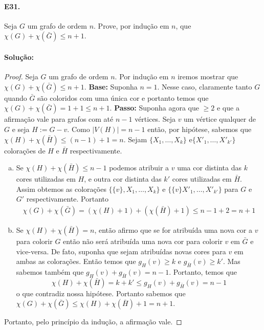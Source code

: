 \documentclass[11pt,a4paper,notitlepage]{exam}
\begin{document}
\paragraph*{E31.} Seja $G$ um grafo de ordem $n$. Prove, por
indução em $n$, que $\chi(G) + \chi(\bar{G}) \leq n + 1$.

\paragraph*{Solução:}
\begin{proof}
    Seja $G$ um grafo de ordem $n$. Por indução em $n$ iremos mostrar
    que $\chi(G) + \chi(\bar{G}) \leq n + 1$.\newline
    \textbf{Base:} Suponha $n = 1$. Nesse caso, claramente tanto $G$
    quando $\bar{G}$ são coloridos com uma única cor e portanto temos
    que $\chi(G) + \chi(\bar{G}) =  1 + 1 \leq n + 1$. \newline
    \textbf{Passo:} Suponha agora que $\geq 2$ e que a afirmação
    vale para grafos com até $n-1$ vértices.
    Seja $v$ um vértice qualquer de $G$ e seja $H := G - v$. Como
    $|V(H)| = n-1$ então, por hipótese, sabemos que $\chi(H) +
    \chi(\bar{H}) \leq (n-1) + 1 = n$. Sejam $\{X_1, \dots,X_k\}$
    e$\{X'_1, \dots, X'_{k'} \}$ colorações de $H$ e $\bar{H}$
    respectivamente. 
    \begin{enumerate}[a)]
        \item  Se $\chi(H) + \chi(\bar{H}) \leq n-1$ podemos atribuir
            a $v$ uma cor distinta das $k$ cores utilizadas em $H$, e
            outra cor distinta das $k'$ cores utilizadas em
            $\bar{H}$. Assim obtemos as colorações $\{\{v\}, X_1, \dots,X_k\}$ e
            $\{\{v\}X'_1, \dots, X'_{k'} \}$ para $G$ e $G'$
            respectivamente. Portanto
            \begin{align*}
                \chi(G) + \chi(\bar{G}) = (\chi(H) + 1) +
                (\chi(\bar{H}) + 1) \leq n-1 + 2 = n+1
            \end{align*}

        \item Se $\chi(H) + \chi(\bar{H}) = n$, então afirmo que se
            for atribuída uma nova cor a $v$ para colorir $G$ então
            não será atribuída uma nova cor para colorir $v$ em
            $\bar{G}$ e vice-versa. De fato, suponha que sejam
            atribuídas novas cores para $v$ em ambas as
            colorações. Então temos que $g_H(v)\geq k$ e
            $g_{\bar{H}}(v)\geq k'$. Mas sabemos também que $g_H(v)
            + g_{\bar{H}}(v) = n-1$. Portanto, temos que $$\chi(H) +
            \chi(\bar{H}) = k + k' \leq g_H(v)
            + g_{\bar{H}}(v) = n-1$$
            o que contradiz nossa hipótese. Portanto sabemos que
            $\chi(G) +
            \chi(\bar{G}) \leq \chi(H) +
            \chi(\bar{H}) + 1 = n + 1$.
    \end{enumerate}
    Portanto, pelo princípio da indução, a afirmação vale.
\end{proof}
\end{document}
